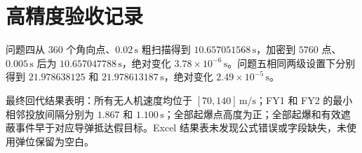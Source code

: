 \section{高精度验收记录}

问题四从 $360$ 个角向点、$0.02\,\mathrm{s}$ 粗扫描得到 $10.657051568\,\mathrm{s}$，加密到 $5760$ 点、$0.005\,\mathrm{s}$ 后为 $10.657047788\,\mathrm{s}$，绝对变化 $3.78\times10^{-6}\,\mathrm{s}$。问题五相同两级设置下分别得到 $21.978638125$ 和 $21.978613187\,\mathrm{s}$，绝对变化 $2.49\times10^{-5}\,\mathrm{s}$。

最终回代结果表明：所有无人机速度均位于 $[70,140]\,\mathrm{m/s}$；FY1 和 FY2 的最小相邻投放间隔分别为 $1.867$ 和 $1.100\,\mathrm{s}$；全部起爆点高度为正；全部起爆和有效遮蔽事件早于对应导弹抵达假目标。Excel 结果表未发现公式错误或字段缺失，未使用弹位保留为空白。
\endinput
\section{Hello World程序--C 源代码}

\begin{lstlisting}[language=c]
#include <stdio.h>

int main() {
  printf("Hello World!");
  return 0;
}
\end{lstlisting}
